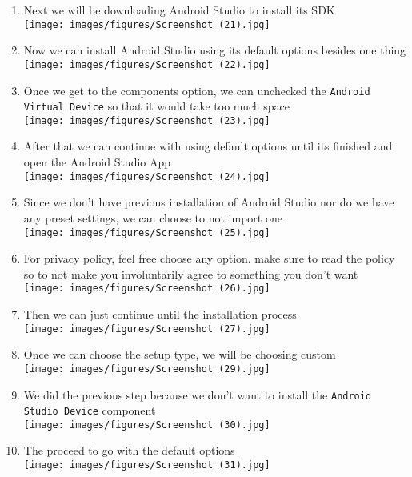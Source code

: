 \documentclass[12pt,titlepage]{article}
\begin{document}
\begin{enumerate}
    \newpage
    \item Next we will be downloading Android Studio to install its SDK \\ \texttt{[image: images/figures/Screenshot (21).jpg]}
    \item Now we can install Android Studio using its default options besides one thing \\ \texttt{[image: images/figures/Screenshot (22).jpg]}
    \newpage
    \item Once we get to the components option, we can unchecked the \texttt{Android Virtual Device} so that it would take too much space \\ \texttt{[image: images/figures/Screenshot (23).jpg]}
    \item After that we can continue with using default options until its finished and open the Android Studio App \\ \texttt{[image: images/figures/Screenshot (24).jpg]}
    \newpage
    \item Since we don't have previous installation of Android Studio nor do we have any preset settings, we can choose to not import one \\ \texttt{[image: images/figures/Screenshot (25).jpg]}
    \item For privacy policy, feel free choose any option. make sure to read the policy so to not make you involuntarily agree to something you don't want \\ \texttt{[image: images/figures/Screenshot (26).jpg]}
    \newpage
    \item Then we can just continue until the installation process \\ \texttt{[image: images/figures/Screenshot (27).jpg]}
    \item Once we can choose the setup type, we will be choosing custom \\ \texttt{[image: images/figures/Screenshot (29).jpg]}
    \newpage
    \item We did the previous step because we don't want to install the \texttt{Android Studio Device} component \\ \texttt{[image: images/figures/Screenshot (30).jpg]}
    \item The proceed to go with the default options \\ \texttt{[image: images/figures/Screenshot (31).jpg]}

\end{enumerate}
\end{document}

